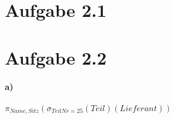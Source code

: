 \documentclass{article}
\begin{document}
	
	
	
	
	\section*{Aufgabe 2.1}
	
	\newpage	
	\section*{Aufgabe 2.2}
	
		\paragraph*{a)}
			$\pi_{Name, Sitz}(\sigma_{TeilNr=25}(Teil)(Lieferant))$
	
		
\end{document}
